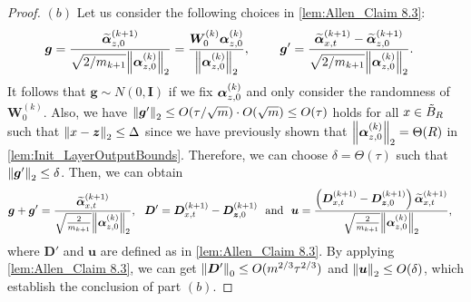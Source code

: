 \begin{proof}
  $(b)$
  Let us consider the following choices in
  \cref{lem:Allen_Claim 8.3}:
  \begin{align*}
    \bm{g}&=\frac{\widetilde{\bm{\alpha}}^{(k+1)}_{z,0}}{\sqrt{{2}/{m_{k+1}}}\norm{{\bm{\alpha}}_{z,0}^{(k)}}_2}=\frac{\bm{W}_0^{(k)}{\bm{\alpha}}_{z,0}^{(k)}}{\norm{{\bm{\alpha}}_{z,0}^{(k)}}_2},\qquad~
    \bm{g}'=\frac{\widetilde{\bm{\alpha}}^{(k+1)}_{x,t}-\widetilde{\bm{\alpha}}^{(k+1)}_{z,0}}{\sqrt{{2}/{m_{k+1}}}\norm{{\bm{\alpha}}_{z,0}^{(k)}}_2}.
  \end{align*}
  It follows that $\bm{g}\sim N(0,\bm{I})$ if we fix ${\bm{\alpha}}_{z,0}^{(k)}$ and only consider the randomness of $\bm{W}^{(k)}_0$.
  Also, we have $\norm{\bm{g}'}_2\leq O(\tau/\sqrt{m})\cdot O(\sqrt{m})\leq O(\tau)$ holds for all $x \in\tilde{B}_R$ such that $\norm{x-\bm{z}}_2 \leq \Delta$ since we have previously shown that $\norm{{\bm{\alpha}}_{z,0}^{(k)}}_2=\Theta(R)$ in \cref{lem:Init_LayerOutputBounds}.
  Therefore, we can choose $\delta=\Theta(\tau)$ such that $\norm{\bm{g}'}_2\leq\delta$.
  Then, we can obtain
  \begin{align*}
    \bm{g}+\bm{g}'=\frac{\widetilde{\bm{\alpha}}^{(k+1)}_{x,t}}{\sqrt{\frac{2}{m_{k+1}}}\norm{{\bm{\alpha}}_{z,0}^{(k)}}_2},~~\bm{D}'=\bm{D}_{x,t}^{(k+1)} - \bm{D}_{{\bm{z}},0}^{(k+1)}~~\text{and}~~\bm{u}=\frac{\left(\bm{D}_{x,t}^{(k+1)} - \bm{D}_{{\bm{z}},0}^{(k+1)}\right)\widetilde{\bm{\alpha}}^{(k+1)}_{x,t}}{\sqrt{\frac{2}{m_{k+1}}}\norm{{\bm{\alpha}}_{z,0}^{(k)}}_2}&,
  \end{align*}
  where $\bm{D}'$ and $\bm{u}$ are defined as in \cref{lem:Allen_Claim 8.3}.
  By applying \cref{lem:Allen_Claim 8.3}, we can get $\norm{\bm{D}'}_0\leq O(m^{2/3}\tau^{2/3})$ and $\norm{\bm{u}}_2\leq O(\delta)$, which establish the conclusion of part $(b)$.







\end{proof}
